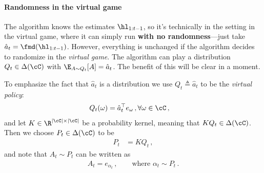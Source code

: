 \paragraph{Randomness in the virtual game}
The algorithm knows the estimates $\hl_{1:t-1}$,
so it's technically in the \olo setting in the virtual game,
where it can simply run \mdalg \textbf{with no randomness}---just
take $\hat{a}_t = \fmd(\hl_{1:t-1})$.
However, everything is unchanged if the algorithm
decides to randomize in the \textit{virtual game}.
The algorithm can play a distribution $Q_t \in \Delta(\cC)$
with $\E_{A \sim Q_t}[A] = \hat{a}_t$.
The benefit of this will be clear in a moment.

To emphasize the fact that $\hat{a}_t$ is a distribution
we use $Q_t\triangleq \hat{a}_t$ to be the \textit{virtual policy}:
\begin{align*}
    Q_t(\omega) & = \hat{a}_t^\top e_\omega\,, \forall \omega \in \cC\,,
\end{align*}
and let $K \in \R^{|\cC| \times |\cC|}$ be a probability kernel,
meaning that $K Q_t \in \Delta(\cC)$.
Then we choose $P_t \in \Delta(\cC)$ to be
\begin{align*}
    P_t & = K Q_t\,,
\end{align*}
and note that $A_t \sim P_t$ can be written as
\begin{align*}
    A_t = e_{\alpha_t}\,, \qquad \text{where } \alpha_t \sim P_t\,.
\end{align*}


